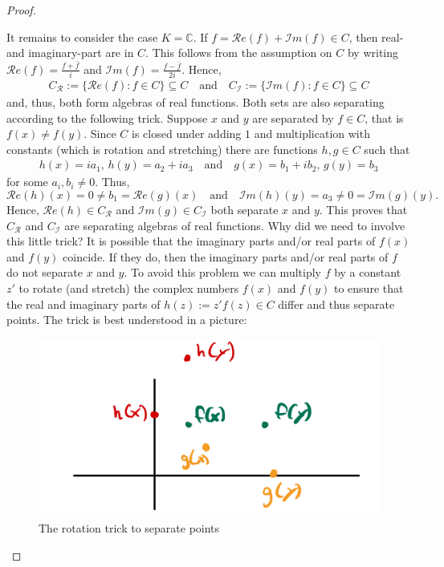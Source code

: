 \begin{proof}[Proof]
\begin{enumerate}[label=(\roman*)]
\end{enumerate}
It remains to consider the case $K = \mathbb{C}$. If $f =\mathcal{R}e(f)+\mathcal{I}m(f) \in C$, then real- and imaginary-part are in $C$. This follows from the assumption on $C$ by writing $\mathcal{R}e(f) = \frac{f + \bar{f}}{i}$ and $\mathcal{I}m(f) = \frac{f - \bar{f}}{2i}$. Hence, 
\begin{align*}
	C_{\mathcal{R}}:=\{ \mathcal{R}e(f) \colon f \in C \}\subseteq C\quad \text{and}\quad 	C_{\mathcal{I}}:=\{ \mathcal{I}m(f) \colon f \in C \} \subseteq C
\end{align*}	
	and, thus, both form algebras of real functions. Both sets are also separating according to the following trick. Suppose $x$ and $y$ are separated by $f\in C$, that is $f(x)\neq f(y)$. Since $C$ is closed under adding $1$ and multiplication with constants (which is rotation and stretching) there are functions $h, g\in C$ such that
	\begin{align*}
		h(x)=ia_1,\, h(y)=a_2+ia_3\quad \text{and}\quad g(x)=b_1+ib_2, \,g(y)=b_3
	\end{align*}
	for some $a_i,b_i\neq 0$.
	Thus, $$\mathcal{R}e(h)(x)=0\neq b_1= \mathcal{R}e(g)(x)\quad \text{and}\quad \mathcal{I}m(h)(y)=a_3\neq 0= \mathcal{I}m(g)(y).$$ Hence, $\mathcal{R}e(h)\in C_{\mathcal{R}}$ and $\mathcal{I}m(g)\in C_{\mathcal{I}}$ both separate $x$ and $y$.
	This proves that $C_{\mathcal R}$ and $C_{\mathcal I}$ are separating algebras of real functions. Why did we need to involve this little trick? It is possible that the imaginary parts and/or real parts of $f(x)$ and $f(y)$ coincide. If they do, then the imaginary parts and/or real parts of $f$ do not separate $x$ and $y$. To avoid this problem we can multiply $f$ by a constant $z'$ to rotate (and stretch) the complex numbers $f(x)$ and $f(y)$ to ensure that the real and imaginary parts of $h(z):=z'f(z)\in C$ differ and thus separate points. The trick is best understood in a picture:
	\begin{figure}[h]
		\vspace{-3mm}
		\begin{center}
			\includegraphics[scale=0.07]{complex.jpeg}
		\end{center}
		\vspace{-3mm}
		\caption*{The rotation trick to separate points}
		\end{figure}	


\end{proof}
